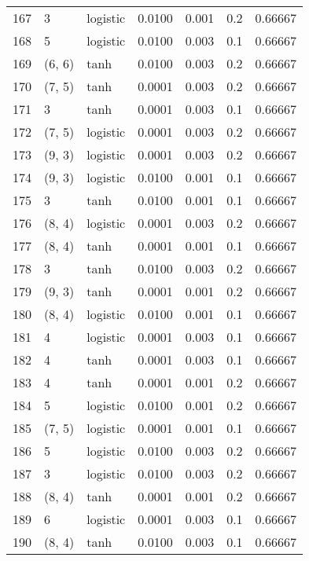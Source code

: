 \begin{tabular}{lllrrrr}
167 &           3 &  logistic &  0.0100 &  0.001 &  0.2 &   0.66667 \\
168 &           5 &  logistic &  0.0100 &  0.003 &  0.1 &   0.66667 \\
169 &      (6, 6) &      tanh &  0.0100 &  0.003 &  0.2 &   0.66667 \\
170 &      (7, 5) &      tanh &  0.0001 &  0.003 &  0.2 &   0.66667 \\
171 &           3 &      tanh &  0.0001 &  0.003 &  0.1 &   0.66667 \\
172 &      (7, 5) &  logistic &  0.0001 &  0.003 &  0.2 &   0.66667 \\
173 &      (9, 3) &  logistic &  0.0001 &  0.003 &  0.2 &   0.66667 \\
174 &      (9, 3) &  logistic &  0.0100 &  0.001 &  0.1 &   0.66667 \\
175 &           3 &      tanh &  0.0100 &  0.001 &  0.1 &   0.66667 \\
176 &      (8, 4) &  logistic &  0.0001 &  0.003 &  0.2 &   0.66667 \\
177 &      (8, 4) &      tanh &  0.0001 &  0.001 &  0.1 &   0.66667 \\
178 &           3 &      tanh &  0.0100 &  0.003 &  0.2 &   0.66667 \\
179 &      (9, 3) &      tanh &  0.0001 &  0.001 &  0.2 &   0.66667 \\
180 &      (8, 4) &  logistic &  0.0100 &  0.001 &  0.1 &   0.66667 \\
181 &           4 &  logistic &  0.0001 &  0.003 &  0.1 &   0.66667 \\
182 &           4 &      tanh &  0.0001 &  0.003 &  0.1 &   0.66667 \\
183 &           4 &      tanh &  0.0001 &  0.001 &  0.2 &   0.66667 \\
184 &           5 &  logistic &  0.0100 &  0.001 &  0.2 &   0.66667 \\
185 &      (7, 5) &  logistic &  0.0001 &  0.001 &  0.1 &   0.66667 \\
186 &           5 &  logistic &  0.0100 &  0.003 &  0.2 &   0.66667 \\
187 &           3 &  logistic &  0.0100 &  0.003 &  0.2 &   0.66667 \\
188 &      (8, 4) &      tanh &  0.0001 &  0.001 &  0.2 &   0.66667 \\
189 &           6 &  logistic &  0.0001 &  0.003 &  0.1 &   0.66667 \\
190 &      (8, 4) &      tanh &  0.0100 &  0.003 &  0.1 &   0.66667 \\

\end{tabular}
